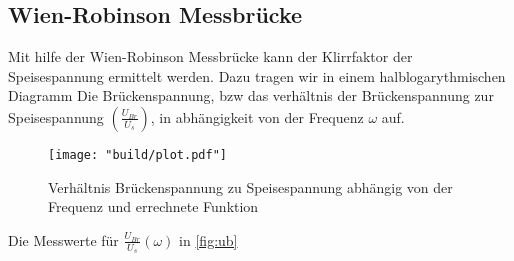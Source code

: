 
\subsection{Wien-Robinson Messbrücke}
Mit hilfe der Wien-Robinson Messbrücke kann der Klirrfaktor der Speisespannung ermittelt 
werden. Dazu tragen wir in einem halblogarythmischen Diagramm Die Brückenspannung, bzw das 
verhältnis der Brückenspannung zur Speisespannung $(\frac{U_{Br}}{U_s})$, in abhängigkeit von 
der Frequenz $\omega$ auf.
\begin{figure}
       \caption{Verhältnis Brückenspannung zu Speisespannung abhängig von der Frequenz und errechnete Funktion}
       \label{fig:ub}
       \centering
       \texttt{[image: "build/plot.pdf"]}
\end{figure}
Die Messwerte für $\frac{U_{Br}}{U_s}\left(\omega\right)$ in \autoref{fig:ub}
